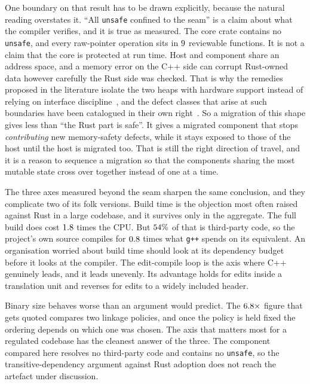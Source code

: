 \documentclass[english,oneside,a4paper,censored,csm,software-track-2020]{HYthesisML}
\begin{document}
One boundary on that result has to be drawn explicitly, because the natural reading overstates
it. ``All \texttt{unsafe} confined to the seam'' is a claim about what the compiler verifies,
and it is true as measured. The core crate contains no \texttt{unsafe}, and every raw-pointer
operation sits in $9$ reviewable functions. It is not a claim that the core is protected at run
time. Host and component share an address space, and a memory error on the C++ side can corrupt
Rust-owned data however carefully the Rust side was checked. That is why the remedies proposed
in the literature isolate the two heaps with hardware support instead of relying on interface
discipline~\cite{rivera2021galeed,kirth2022pkrusafe}, and the defect classes that arise at such
boundaries have been catalogued in their own right~\cite{li2022crosslang}. So a migration
of this shape gives less than ``the Rust part is safe''. It gives a migrated
component that stops \emph{contributing} new memory-safety defects, while it stays exposed to those
of the host until the host is migrated too. That is still the right direction of travel, and it
is a reason to sequence a migration so that the components sharing the most mutable state cross
over together instead of one at a time.

The three axes measured beyond the seam sharpen the same conclusion, and they complicate two of its
folk versions. Build time is the objection most often raised against Rust in a large codebase, and
it survives only in the aggregate. The full build does cost $1.8$ times the CPU. But
$54\%$ of that is third-party code, so the project's own source compiles for
$0.8$ times what \texttt{g++} spends on its equivalent. An organisation
worried about build time should look at its dependency budget before it looks at the
compiler. The edit-compile loop is the axis where C++ genuinely leads, and it leads unevenly. Its
advantage holds for edits inside a translation unit and reverses for edits to a widely included
header.

Binary size behaves worse than an argument would predict. The $6.8\times$
figure that gets quoted compares two linkage policies, and once the policy is held fixed
the ordering depends on which one was chosen. The axis that matters most for a regulated codebase
has the cleanest answer of the three. The component compared here resolves no third-party code
and contains no \texttt{unsafe}, so the transitive-dependency argument against Rust adoption does
not reach the artefact under discussion.
\end{document}
